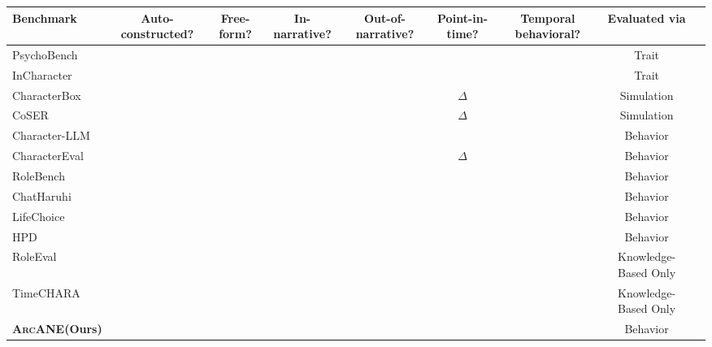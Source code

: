 \documentclass{llmxive}
\providecommand{\ours}{\textsc{ArcANE}}
\providecommand{\cmark}{\ding{51}}
\providecommand{\xmark}{\ding{55}}
\providecommand{\arraystretch}{0.95}
\begin{document}
{\renewcommand{\arraystretch}{0.95}
\setlength{\tabcolsep}{5pt}
\begin{table}[t!]
\centering
\small
\begin{adjustbox}{width=\textwidth}
\begin{tabular}{lcccccccl}
\toprule
\textbf{Benchmark} & 
\textbf{Auto-constructed?} & 
\textbf{Free-form?} & 
\textbf{In-narrative?} & 
\textbf{Out-of-narrative?} & 
\textbf{Point-in-time?} & 
\textbf{Temporal behavioral?} & 
\textbf{Evaluated via} \\
\midrule
PsychoBench~\cite{huang2024psychobench}    & \xmark & \xmark & \xmark & \xmark & \xmark & \xmark & Trait \\
InCharacter~\cite{wang-etal-2024-incharacter}  & \cmark & \cmark & \xmark & \xmark & \xmark & \xmark & Trait \\
CharacterBox~\cite{wang-etal-2025-characterbox} & \cmark & \cmark & \cmark & \cmark & $\Delta$ & \xmark & Simulation \\
CoSER~\cite{wang2025coser} & \cmark & \cmark & \cmark & \xmark & $\Delta$ & \xmark & Simulation \\
Character-LLM~\cite{shao-etal-2023-characterllm} & \cmark & \cmark & \xmark & \cmark & \xmark & \xmark & Behavior \\
CharacterEval~\cite{tu-etal-2024-charactereval} & \cmark & \cmark & \cmark & \xmark & $\Delta$ & \xmark & Behavior \\
RoleBench~\cite{wang-etal-2024-rolellm}      & \cmark & \cmark & \xmark & \cmark & \xmark & \xmark & Behavior \\
ChatHaruhi~\cite{Li2023chatharuhi}    & \cmark & \cmark & \cmark & \xmark & \xmark & \xmark & Behavior \\
LifeChoice~\cite{xu-etal-2025-characterisdestiny} & \cmark & \xmark & \cmark & \xmark & \cmark & \xmark & Behavior \\
HPD~\cite{chen-etal-2023-hpd}                & \cmark & \cmark & \cmark & \xmark & \cmark & \cmark & Behavior \\
RoleEval~\cite{shen2024roleevalbilingualroleevaluation}      & \xmark & \xmark & \cmark & \xmark & \xmark & \xmark & Knowledge-Based Only \\
TimeCHARA~\cite{ahn-etal-2024-timechara} & \cmark & \cmark & \cmark & \xmark & \cmark & \xmark & Knowledge-Based Only \\
\midrule
\rowcolor{gray!15}
\textbf{\ours (Ours)}             & \cmark & \cmark & \cmark & \cmark & \cmark & \cmark & Behavior \\
\bottomrule

\end{tabular}
\end{adjustbox}
\end{table}}
\end{document}
